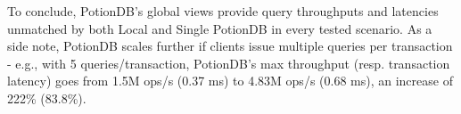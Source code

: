 \documentclass[sigconf, nonacm]{acmart}
\begin{document}



To conclude, PotionDB's global views provide query throughputs and latencies unmatched by both Local and Single PotionDB in every tested scenario.
As a side note, PotionDB scales further if clients issue multiple queries per transaction - e.g., with 5 queries/transaction, PotionDB's max throughput (resp. transaction latency) goes from 1.5M ops/s (0.37 ms) to 4.83M ops/s (0.68 ms), an increase of 222\% (83.8\%).
\end{document}
